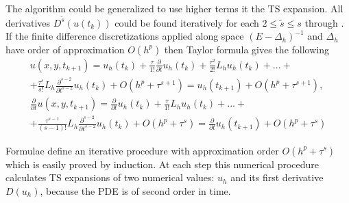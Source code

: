 \documentclass[11pt,a4paper,twoside]{article}
\begin{document}
The algorithm could be generalized to use higher terms it the TS expansion. All derivatives $D^{\tilde s}(u(t_k))$ could be found iteratively for each $2 \leq \tilde s \leq s$ through . If the finite difference discretizations applied along space $(E - \Delta_h)^{-1}$ and $\Delta_h$ have order of approximation $O(h^p)$ then Taylor formula gives the following
\begin{align} \label{GeneralIt}
u(x,y,t_{k+1}) = u_h(t_k) + \frac{\tau } {1!}  \frac{\partial}{\partial t} u_h(t_k) + \frac{ \tau^2} { 2!}L_h u_h(t_k) +... + \nonumber
\\ + \frac{\tau^s}{ s! }L_h \frac{\partial^{s-2}}{\partial t^{s-2}} u_h(t_k) + O(h^p + \tau^{s+1}) = u_h(t_{k+1}) + O(h^p + \tau^{s+1}), \nonumber
\\  \frac{\partial}{\partial t}u(x,y,t_{k+1}) = \frac{\partial}{\partial t} u_h(t_k) + \frac{\tau } {1!}  L_h u_h(t_k) + ... + \nonumber
\\ + \frac{\tau^{s-1}}{ (s-1)! } L_h \frac{\partial^{s-2} }{\partial t^{s-2}} u_h(t_k)  + O(h^p + \tau^s) = \frac{\partial}{\partial t}u_h(t_{k+1}) + O(h^p + \tau^s)
\end{align}

Formulae  define an iterative procedure with approximation order $O(h^p + \tau^s)$ which is easily proved by induction. At each step this numerical procedure calculates TS expansions of two numerical values: $u_h$ and its first derivative $D(u_h)$, because the PDE is of second order in time. 

\end{document}
